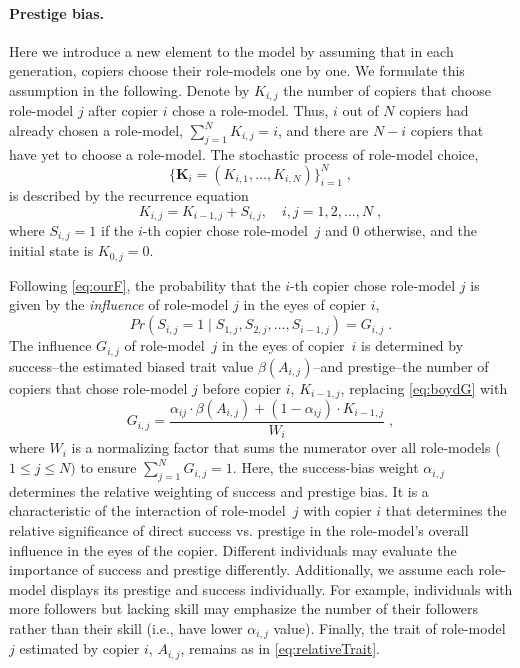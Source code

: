 \documentclass[12pt]{extarticle}
\let\vec\mathbf
\begin{document}
\paragraph{Prestige bias.}
Here we introduce a new element to the model by assuming that in each generation, copiers choose their role-models one by one.
We formulate this assumption in the following.
Denote by $K_{i,j}$  the number of copiers that choose role-model $j$ after copier $i$ chose a role-model. Thus, $i$ out of $N$ copiers had already chosen a role-model, $\sum_{j=1}^N{K_{i,j}} = i$, and there are $N-i$ copiers that have yet to choose a role-model.
The stochastic process of role-model choice, 
\begin{equation} \label{eq:process}
\big\{\vec{K}_i = (K_{i,1}, \ldots, K_{i,N}) \big\}_{i=1}^N \;,
\end{equation}
is described by the recurrence equation
\begin{equation} \label{eq:recurrence}
K_{i,j} = K_{i-1,j} + S_{i,j}, \quad i,j=1,2,\ldots,N \;,
\end{equation}
where $S_{i,j}=1$ if the $i$-th copier chose role-model~$j$ and 0 otherwise, and the initial state is $K_{0,j}=0$.

Following \cref{eq:ourF}, the probability that the $i$-th copier chose role-model $j$ is given by the \emph{influence} of role-model $j$ in the eyes of copier $i$,
\begin{equation}\label{eq:recPrestige}
Pr(S_{i,j}=1 \mid S_{1,j},S_{2,j},...,S_{i-1,j}) = G_{i,j} \;.
\end{equation}
The influence $G_{i,j}$ of role-model~$j$ in the eyes of copier~$i$ is determined by success--the estimated biased trait value $\beta(A_{i,j})$--and prestige--the number of copiers that chose role-model $j$ before copier $i$, $K_{i-1,j}$, replacing \cref{eq:boydG} with
\begin{equation}\label{eq:prestige}
G_{i,j} = \frac{\alpha_{ij} \cdot \beta(A_{i,j}) + (1-\alpha_{ij}) \cdot K_{i-1,j}}{W_i} \;,
\end{equation}
where $W_i$ is a normalizing factor that sums the numerator over all role-models ($1\le j \le N)$ to ensure $\sum_{j=1}^{N}{G_{i,j}}=1$.
Here, the success-bias weight $\alpha_{i,j}$ determines the relative weighting of success and prestige bias. It is a characteristic of the interaction of role-model~$j$ with copier $i$ that determines the relative significance of direct success vs. prestige in the role-model's overall influence in the eyes of the copier.
Different individuals may evaluate the importance of success and prestige differently. Additionally, we assume each role-model displays its prestige and success individually. For example, individuals with more followers but lacking skill may emphasize the number of their followers rather than their skill (i.e., have lower $\alpha_{i,j}$ value).
Finally, the trait of role-model $j$ estimated by copier $i$, $A_{i,j}$, remains as in \cref{eq:relativeTrait}.
\end{document}
